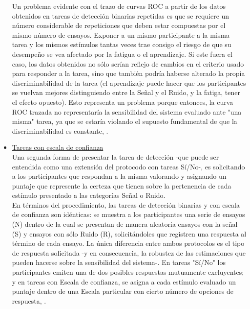 \begin{itemize}
Un problema evidente con el trazo de curvas ROC a partir de los datos obtenidos en tareas de detección binarias repetidas es que se requiere un número considerable de repeticiones que deben estar compuestas por el mismo número de ensayos. Exponer a un mismo participante a la misma tarea y los mismos estímulos tantas veces trae consigo el riesgo de que su desempeño se vea afectado por la fatigua o el aprendizaje. Si este fuera el caso, los datos obtenidos no sólo serían reflejo de cambios en el criterio usado para responder a la tarea, sino que también podría haberse alterado la propia discriminabilidad de la tarea (el aprendizaje puede hacer que los participantes se vuelvan mejores distinguiendo entre la Señal y el Ruido, y la fatiga, tener el efecto opuesto). Esto representa un problema porque entonces, la curva ROC trazada no representaría la sensibilidad del sistema evaluado ante "una misma" tarea, ya que se estaría violando el supuesto fundamental de que la discriminabilidad es constante, \parencite{McNicol2}.\\

\item \underline{Tareas con escala de confianza}\\

Una segunda forma de presentar la tarea de detección -que puede ser entendida como una extensión del protocodo con tareas Sí/No-, es solicitando a los participantes que respondan a la misma valorando y asignando un puntaje que represente la certeza que tienen sobre la pertenencia de cada estímulo presentado a las categorías Señal o Ruido.\\

En términos del procedimiento, las tareas de detección binarias y con escala de confianza son idénticas: se muestra a los participantes una serie de ensayos (N) dentro de la cual se presentan de manera aleatoria ensayos con la señal (S) y ensayos con sólo Ruido (R), solicitándoles que registren una respuesta al término de cada ensayo. La única diferencia entre ambos protocolos es el tipo de respuesta solicitada -y en consecuencia, la robustez de las estimaciones que pueden hacerse sobre la sensibilidad del sistema-. En tareas "Sí/No" los participantes emiten una de dos posibles respuestas mutuamente excluyentes; y en tareas con Escala de confianza, se asigna a cada estímulo evaluado un puntaje dentro de una Escala particular con cierto número de opciones de respuesta, \parencite{Stainslaw1999}.\\


\end{itemize}
